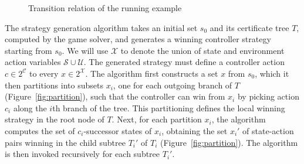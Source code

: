 
\begin{figure}
    \centering
    \caption{Transition relation of the running example}
    \label{fig:stratExample}
\end{figure}

The strategy generation algorithm takes an initial set $s_0$ and its certificate tree $T$, computed by the game solver, and generates a winning controller strategy starting from $s_0$. We will use $\mathcal{X}$ to denote the union of state and environment action variables $\mathcal{S} \cup \mathcal{U}$. The generated strategy must define a controller action $c \in 2^{\mathcal{C}}$ to every $x \in 2^{\mathcal{X}}$. The algorithm first constructs a set $x$ from $s_0$, which it then partitions into subsets $x_i$, one for each outgoing branch of $T$ (Figure~\ref{fig:partition}), such that the controller can win from $x_i$ by picking action $c_i$ along the $i$th branch of the tree. This partitioning defines the local winning strategy in the root node of $T$.  Next, for each partition $x_i$, the algorithm computes the set of $c_i$-successor states of $x_i$, obtaining the set $x_i'$ of state-action pairs winning in the child subtree $T_i'$ of $T_i$ (Figure~\ref{fig:partition}).  The algorithm is then invoked recursively for each subtree $T_i'$.


